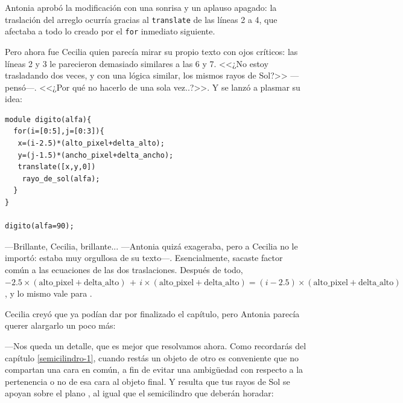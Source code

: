     Antonia aprobó la modificación con una sonrisa y un aplauso
    apagado: la traslación del arreglo ocurría gracias al
    \lstinline!translate! de las líneas 2 a 4, que afectaba a todo lo
    creado por el \lstinline!for! inmediato siguiente.

    Pero ahora fue Cecilia quien parecía mirar su propio texto con
    ojos críticos: las líneas 2 y 3 le parecieron demasiado similares
    a las 6 y 7. <<¿No estoy trasladando dos veces, y con una lógica
    similar, los mismos rayos de Sol?>> ---pensó---. <<¿Por qué no
    hacerlo de una sola vez..?>>. Y se lanzó a plasmar su idea:

\begin{lstlisting}
module digito(alfa){
  for(i=[0:5],j=[0:3]){
   x=(i-2.5)*(alto_pixel+delta_alto);
   y=(j-1.5)*(ancho_pixel+delta_ancho);
   translate([x,y,0])
    rayo_de_sol(alfa);
  } 
} 

digito(alfa=90);
    \end{lstlisting}




    
    ---Brillante, Cecilia, brillante...  ---Antonia quizá exageraba,
    pero a Cecilia no le importó: estaba muy orgullosa de su
    texto---. Esencialmente, sacaste factor común a las ecuaciones de
    las dos traslaciones.  Después de todo,
    $-2.5 \times (\text{alto\_pixel}+\text{delta\_alto})\, + \, i\times
    (\text{alto\_pixel}+\text{delta\_alto}) = (i-2.5) \times
    (\text{alto\_pixel}+\text{delta\_alto})$, y lo mismo vale para
    .


    Cecilia creyó que ya podían dar por finalizado el capítulo, pero
    Antonia parecía querer alargarlo un poco más:

    ---Nos queda un detalle, que es mejor que resolvamos ahora. Como
    recordarás del capítulo \ref{semicilindro-1}, cuando restás un
    objeto de otro es conveniente que no compartan una cara en común,
    a fin de evitar una ambigüedad con respecto a la pertenencia o no
    de esa cara al objeto final. Y resulta que tus rayos de Sol se
    apoyan sobre el plano , al igual que el semicilindro que
    deberán horadar:


